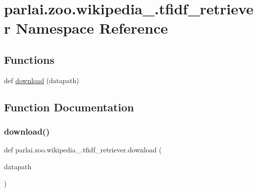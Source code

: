 \hypertarget{namespaceparlai_1_1zoo_1_1wikipedia__20161221_1_1tfidf__retriever}{}\section{parlai.\+zoo.\+wikipedia\+\_.\+tfidf\+\_\+retriever Namespace Reference}
\label{namespaceparlai_1_1zoo_1_1wikipedia__20161221_1_1tfidf__retriever}
\subsection*{Functions}
\begin{DoxyCompactItemize}
\item 
def \hyperlink{namespaceparlai_1_1zoo_1_1wikipedia__20161221_1_1tfidf__retriever_ab7244a441485a5fe1c530388a63a5a91}{download} (datapath)
\end{DoxyCompactItemize}


\subsection{Function Documentation}
\mbox{\label{namespaceparlai_1_1zoo_1_1wikipedia__20161221_1_1tfidf__retriever_ab7244a441485a5fe1c530388a63a5a91}} 
\subsubsection{\texorpdfstring{download()}{download()}}
{\footnotesize\ttfamily def parlai.\+zoo.\+wikipedia\+\_.\+tfidf\+\_\+retriever.\+download (\begin{DoxyParamCaption}\item[{}]{datapath }\end{DoxyParamCaption})}

